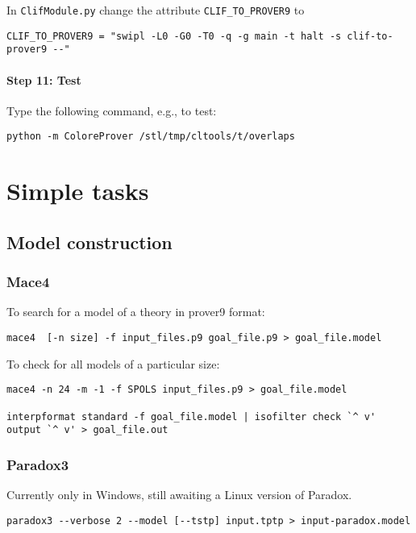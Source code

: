 \documentclass{article}
\begin{document}
In \texttt{ClifModule.py} change the attribute \texttt{CLIF\_TO\_PROVER9} to
\begin{verbatim}
CLIF_TO_PROVER9 = "swipl -L0 -G0 -T0 -q -g main -t halt -s clif-to-prover9 --"
\end{verbatim}

\paragraph{Step 11: Test}

Type the following command, e.g., to test:

\begin{verbatim}
python -m ColoreProver /stl/tmp/cltools/t/overlaps
\end{verbatim}


\section{Simple tasks}

\subsection{Model construction}

\subsubsection{Mace4}

To search for a model of a theory in prover9 format:

\begin{verbatim}
mace4  [-n size] -f input_files.p9 goal_file.p9 > goal_file.model
\end{verbatim}

To check for all models of a particular size:

\begin{verbatim}
mace4 -n 24 -m -1 -f SPOLS input_files.p9 > goal_file.model

interpformat standard -f goal_file.model | isofilter check `^ v' output `^ v' > goal_file.out
\end{verbatim}

\subsubsection{Paradox3}

Currently only in Windows, still awaiting a Linux version of Paradox.

\begin{verbatim}
paradox3 --verbose 2 --model [--tstp] input.tptp > input-paradox.model
\end{verbatim}
\end{document}
